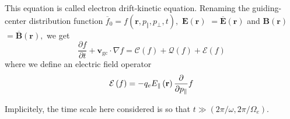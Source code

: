 This equation is called electron drift-kinetic equation. Renaming the
guiding-center distribution function $\overline{f}_{0}=f\left( \mathbf{r}%
,p_{\Vert },p_{\bot },t\right) ,$ $\mathbf{E}\left( \mathbf{r}\right) $ $=%
\overline{\mathbf{E}}\left( \mathbf{r}\right) $ and $\mathbf{B}\left(
\mathbf{r}\right) $ $=\overline{\mathbf{B}}\left( \mathbf{r}\right) ,$ we
get
\begin{equation}
\frac{\partial f}{\partial t}+\mathbf{v}_{\text{gc}}\cdot \nabla f=\mathcal{C%
}\left( f\right) +\mathcal{Q}\left( f\right) +\mathcal{E}\left( f\right)
\end{equation}
where we define an electric field operator
\begin{equation}
\mathcal{E}\left( f\right) =-q_{e}E_{\Vert }\left( \mathbf{r}\right) \frac{%
\partial }{\partial p_{\Vert }}f \label{EfieldFPterm}
\end{equation}

Implicitely, the time scale here considered is so that $t\gg \left( 2\pi
/\omega ,2\pi /\Omega _{e}\right) .$
